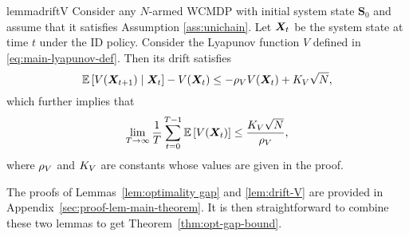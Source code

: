\documentclass[11pt,letterpaper]{article}
\begin{document}
\begin{restatable}{lemma}{driftV}\label{lem:drift-V}
Consider any $N$-armed WCMDP with initial system state $\bm{S}_0$ and assume that it satisfies Assumption \ref{ass:unichain}.
Let ${\bm{X}}_t$ be the system state at time $t$ under the ID policy.
Consider the Lyapunov function $V$ defined in \eqref{eq:main-lyapunov-def}.
Then its drift satisfies
\begin{equation}
    \label{eq:main-drift-inequality}
    \mathbb{E}\left[V({\bm{X}}_{t+1}) \;|\; {\bm{X}}_t\right]-V({\bm{X}}_t) \leq -\rho_V V({\bm{X}}_t) + K_V \sqrt{N}, 
\end{equation}
which further implies that
\begin{equation}
    \label{eq:main-final-EV-bound}
    \lim_{T\to\infty} \frac{1}{T} \sum_{t=0}^{T-1} \mathbb{E}\left[V({\bm{X}}_{t})\right] \leq \frac{K_V\sqrt{N}}{\rho_V},
\end{equation}
where $\rho_V$ and $K_V$ are constants whose values are given in the proof. 
\end{restatable}

The proofs of Lemmas~\ref{lem:optimality gap} and \ref{lem:drift-V} are provided in Appendix~\ref{sec:proof-lem-main-theorem}.
It is then straightforward to combine these two lemmas to get Theorem~\ref{thm:opt-gap-bound}.









\newpage
\appendix

\end{document}
